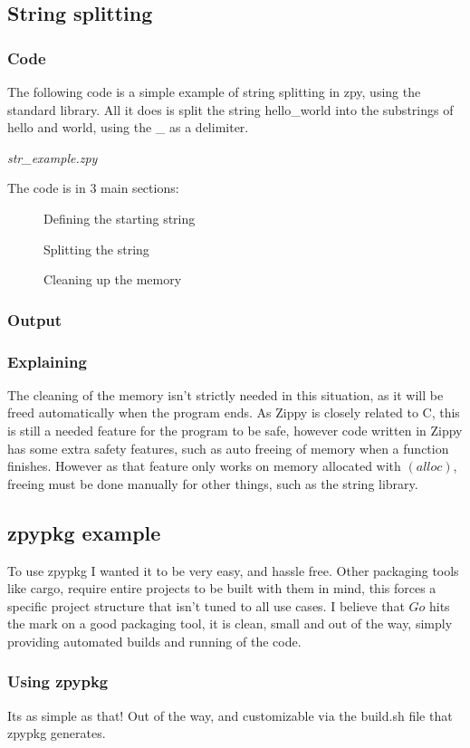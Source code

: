 \documentclass[a4paper,12pt]{article}
\begin{document}
{\subsection{String splitting}
\subsubsection{Code}
The following code is a simple example of string splitting in zpy, using the standard library. All it does 
is split the string hello\_world into the substrings of hello and world, using the \_ as a delimiter.

\textit{str\_example.zpy}

The code is in 3 main sections:
\begin{description}
	\item[] Defining the starting string
	\item[] Splitting the string
	\item[] Cleaning up the memory
\end{description}
\subsubsection{Output}

\subsubsection{Explaining}
The cleaning of the memory isn't strictly needed in this situation, as it will be freed automatically when
the program ends. As Zippy is closely related to C, this is still a needed feature for the program to be 
safe, however code written in Zippy has some extra safety features, such as auto freeing of memory when 
a function finishes. However as that feature only works on memory allocated with \((alloc)\), freeing must be done
manually for other things, such as the string library.

\subsection{zpypkg example}
To use zpypkg I wanted it to be very easy, and hassle free. Other packaging tools like cargo, require entire
projects to be built with them in mind, this forces a specific project structure that isn't tuned to all use
cases. I believe that \(Go\) hits the mark on a good packaging tool, it is clean, small and out of the way, 
simply providing automated builds and running of the code.
\subsubsection{Using zpypkg}

Its as simple as that! Out of the way, and customizable via the build.sh file that zpypkg generates.

}
\end{document}
